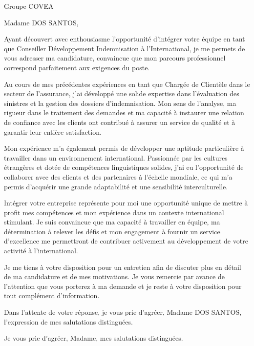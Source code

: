 \documentclass[10pt]{lettre}
\begin{document}
\begin{letter}{Groupe COVEA}
\address{Inmaculada Poirier\\47, rue du stade\\79210 Saint Georges de Rex\\France}
\nofax

\def\concname{Objet :~} %
\opening{Madame DOS SANTOS,}

Ayant découvert avec enthousiasme l'opportunité d'intégrer votre équipe en tant que Conseiller Développement Indemnisation à l'International, 
je me permets de vous adresser ma candidature, convaincue que mon parcours professionnel correspond parfaitement aux exigences du poste.

Au cours de mes précédentes expériences en tant que Chargée de Clientèle dans le secteur de l'assurance, j'ai développé une solide expertise 
dans l'évaluation des sinistres et la gestion des dossiers d'indemnisation. Mon sens de l'analyse, ma rigueur dans le traitement des demandes 
et ma capacité à instaurer une relation de confiance avec les clients ont contribué à assurer un service de qualité et à garantir leur entière satisfaction.

Mon expérience m'a également permis de développer une aptitude particulière à travailler dans un environnement international. Passionnée par 
les cultures étrangères et dotée de compétences linguistiques solides, j'ai eu l'opportunité de collaborer avec des clients et des partenaires 
à l'échelle mondiale, ce qui m'a permis d'acquérir une grande adaptabilité et une sensibilité interculturelle.

Intégrer votre entreprise représente pour moi une opportunité unique de mettre à profit mes compétences et mon expérience dans un contexte 
international stimulant. Je suis convaincue que ma capacité à travailler en équipe, ma détermination à relever les défis et mon engagement 
à fournir un service d'excellence me permettront de contribuer activement au développement de votre activité à l'international.

Je me tiens à votre disposition pour un entretien afin de discuter plus en détail de ma candidature et de mes motivations. 
Je vous remercie par avance de l'attention que vous porterez à ma demande et je reste à votre disposition pour tout complément d'information.

Dans l'attente de votre réponse, je vous prie d'agréer, Madame DOS SANTOS, l'expression de mes salutations distinguées.

\closing{Je vous prie d'agréer, Madame, mes salutations distinguées.}

\end{letter}
\end{document}
